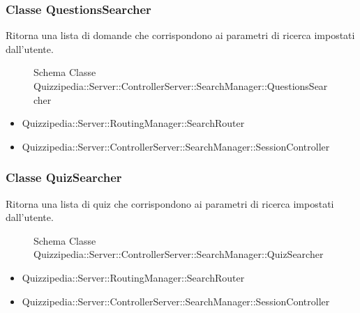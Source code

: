 \subsubsection{Classe QuestionsSearcher}
Ritorna una lista di domande che corrispondono ai parametri di ricerca impostati dall'utente.
\begin{figure}[H]
\centering
\noindent{}
\caption[Schema Classe QuestionsSearcher]{Schema Classe Quizzipedia::Server::ControllerServer::SearchManager::QuestionsSearcher}
\end{figure}
\begin{itemize}
\item Quizzipedia::Server::RoutingManager::SearchRouter
\end{itemize}
\begin{itemize}
\item Quizzipedia::Server::ControllerServer::SearchManager::SessionController
\end{itemize}
\subsubsection{Classe QuizSearcher}
Ritorna una lista di quiz che corrispondono ai parametri di ricerca impostati dall'utente.
\begin{figure}[H]
\centering
\noindent{}
\caption[Schema Classe QuizSearcher]{Schema Classe Quizzipedia::Server::ControllerServer::SearchManager::QuizSearcher}
\end{figure}
\begin{itemize}
\item Quizzipedia::Server::RoutingManager::SearchRouter
\end{itemize}
\begin{itemize}
\item Quizzipedia::Server::ControllerServer::SearchManager::SessionController
\end{itemize}
